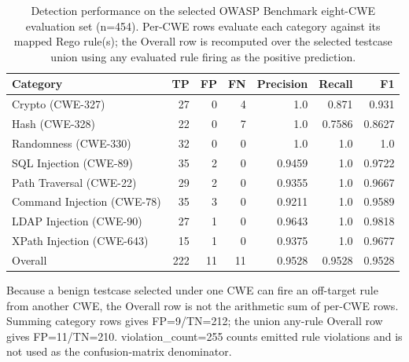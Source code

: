 \begin{table}[h]
\centering
\begin{tabular}{lrrrrrr}
\hline
Category & TP & FP & FN & Precision & Recall & F1 \\
\hline
Crypto (CWE-327) & 27 & 0 & 4 & 1.0 & 0.871 & 0.931 \\
Hash (CWE-328) & 22 & 0 & 7 & 1.0 & 0.7586 & 0.8627 \\
Randomness (CWE-330) & 32 & 0 & 0 & 1.0 & 1.0 & 1.0 \\
SQL Injection (CWE-89) & 35 & 2 & 0 & 0.9459 & 1.0 & 0.9722 \\
Path Traversal (CWE-22) & 29 & 2 & 0 & 0.9355 & 1.0 & 0.9667 \\
Command Injection (CWE-78) & 35 & 3 & 0 & 0.9211 & 1.0 & 0.9589 \\
LDAP Injection (CWE-90) & 27 & 1 & 0 & 0.9643 & 1.0 & 0.9818 \\
XPath Injection (CWE-643) & 15 & 1 & 0 & 0.9375 & 1.0 & 0.9677 \\
Overall & 222 & 11 & 11 & 0.9528 & 0.9528 & 0.9528 \\
\hline
\end{tabular}
\begin{minipage}{0.95\linewidth}
\footnotesize Because a benign testcase selected under one CWE can fire an off-target rule from another CWE, the Overall row is not the arithmetic sum of per-CWE rows. Summing category rows gives FP=9/TN=212; the union any-rule Overall row gives FP=11/TN=210. violation\_count=255 counts emitted rule violations and is not used as the confusion-matrix denominator.
\end{minipage}
\caption{Detection performance on the selected OWASP Benchmark eight-CWE evaluation set (n=454). Per-CWE rows evaluate each category against its mapped Rego rule(s); the Overall row is recomputed over the selected testcase union using any evaluated rule firing as the positive prediction.}
\label{tab:detection-selected-eight-cwe}
\end{table}
